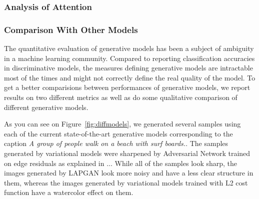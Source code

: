 \documentclass{article} %
\begin{document}
%
%
%

%
%
%

\subsubsection{Analysis of Attention}

\subsubsection{Comparison With Other Models}
The quantitative evaluation of generative models has been a subject of ambiguity in a machine learning community. Compared to reporting classification accuracies in discriminative models, the measures defining generative models are intractable most of the times and might not correctly define the real quality of the model. To get a better comparisions between performances of generative models, we report results on two different metrics as well as do some qualitative comparison of different generative models.

As you can see on Figure~\ref{fig:diffmodels}, we generated several samples using each of the current state-of-the-art generative models corresponding to the caption \textit{A group of people walk on a beach with surf boards.}. The samples generated by variational models were sharpened by Adversarial Network trained on edge residuals as explained in ... While all of the samples look sharp, the images generated by LAPGAN look more noisy and have a less clear structure in them, whereas the images generated by variational models trained with L2 cost function have a watercolor effect on them.
\end{document}
